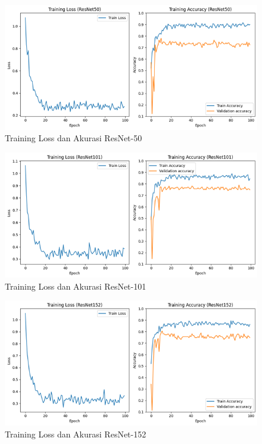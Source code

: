     \begin{figure}[hbtp]
        \centering
        \includegraphics[scale=0.8]{gambar/TrainingGraphResNet50class-weighted.png}
        \caption{Training Loss dan Akurasi ResNet-50}
        \label{Img:GraphResNet50}
    \end{figure}
    \begin{figure}[hbtp]
        \centering
        \includegraphics[scale=0.8]{gambar/TrainingGraphResNet101class-weighted.png}
        \caption{Training Loss dan Akurasi ResNet-101}
        \label{Img:GraphResNet101}
    \end{figure}
    \begin{figure}[hbtp]
        \centering
        \includegraphics[scale=0.8]{gambar/TrainingGraphResNet152class-weighted.png}
        \caption{Training Loss dan Akurasi ResNet-152}
        \label{Img:GraphResNet152}
    \end{figure}


